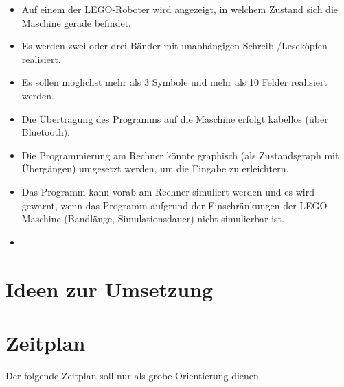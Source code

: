\documentclass[a4paper,12pt]{article}
\begin{document}
\begin{itemize}
\item Auf einem der LEGO-Roboter wird angezeigt, in welchem Zustand sich die Maschine gerade befindet.
\item Es werden zwei oder drei Bänder mit unabhängigen Schreib-/Leseköpfen realisiert.
\item Es sollen möglichst mehr als 3 Symbole und mehr als 10 Felder realisiert werden.
\item Die Übertragung des Programms auf die Maschine erfolgt kabellos (über Bluetooth).
\item Die Programmierung am Rechner könnte graphisch (als Zustandsgraph mit Übergängen) umgesetzt werden, um die Eingabe zu erleichtern.
\item Das Programm kann vorab am Rechner simuliert werden und es wird gewarnt, wenn das Programm aufgrund der Einschränkungen der LEGO-Maschine (Bandlänge, Simulationsdauer) nicht simulierbar ist.
\item {}
\end{itemize}

\section{Ideen zur Umsetzung}


\section{Zeitplan}

Der folgende Zeitplan soll nur als grobe Orientierung dienen.\\
\end{document}
